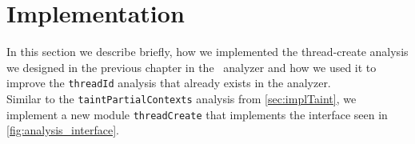   

  \section{Implementation}
    In this section we describe briefly, how we implemented the thread-create analysis we designed in the previous chapter in the \gob\ analyzer and how we used it to improve the \texttt{threadId} analysis that already exists in the analyzer.\\
    Similar to the \texttt{taintPartialContexts} analysis from \autoref{sec:implTaint}, we implement a new module \texttt{threadCreate} that implements the interface seen in \autoref{fig:analysis_interface}.

